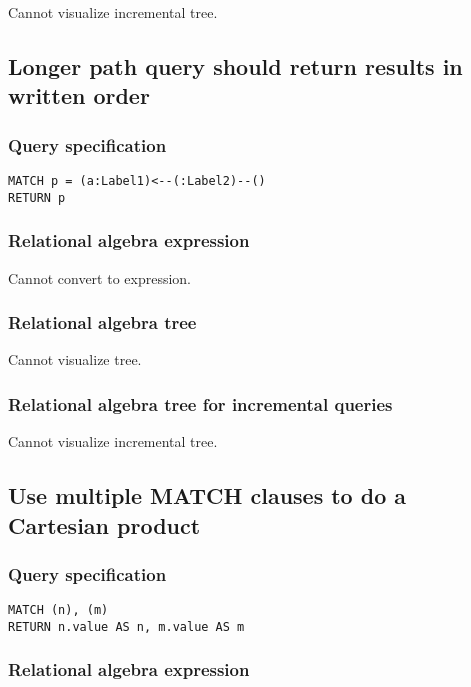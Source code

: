 Cannot visualize incremental tree.

\subsection{Longer path query should return results in written order}

\subsubsection*{Query specification}

\begin{lstlisting}
MATCH p = (a:Label1)<--(:Label2)--()
RETURN p
\end{lstlisting}

\subsubsection*{Relational algebra expression}

Cannot convert to expression.

\subsubsection*{Relational algebra tree}

Cannot visualize tree.

\subsubsection*{Relational algebra tree for incremental queries}

Cannot visualize incremental tree.

\subsection{Use multiple MATCH clauses to do a Cartesian product}

\subsubsection*{Query specification}

\begin{lstlisting}
MATCH (n), (m)
RETURN n.value AS n, m.value AS m
\end{lstlisting}

\subsubsection*{Relational algebra expression}

